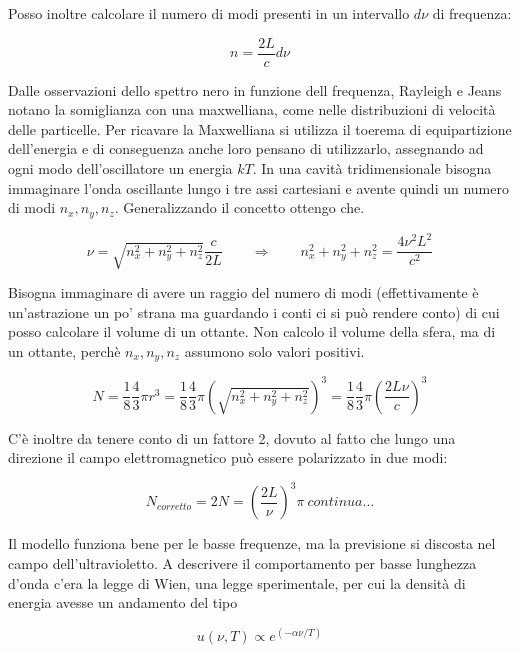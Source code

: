 \documentclass[11pt,a4paper]{article}
\begin{document}
Posso inoltre calcolare il numero di modi presenti in un intervallo $ d\nu $ di frequenza:

\begin{equation}
n = \frac{2L}{c} d\nu
\end{equation}

Dalle osservazioni dello spettro nero in funzione dell frequenza, Rayleigh e Jeans notano la somiglianza con una maxwelliana, come nelle distribuzioni di velocità delle particelle. Per ricavare la Maxwelliana si utilizza il toerema di equipartizione dell'energia e di conseguenza anche loro pensano di utilizzarlo, assegnando ad ogni modo dell'oscillatore un energia $ kT $. In una cavità tridimensionale bisogna immaginare l'onda oscillante lungo i tre assi cartesiani e avente quindi un numero di modi $ n_x, n_y, n_z $. Generalizzando il concetto ottengo che.

\begin{equation}
\nu = \sqrt{n_x^2 + n_y^2 + n_z^2}\frac{c}{2L} \qquad \Rightarrow \qquad n_x^2 + n_y^2 + n_z^2 = \frac{4\nu^2L^2}{c^2}
\end{equation}

Bisogna immaginare di avere un raggio del numero di modi (effettivamente è un'astrazione un po' strana ma guardando i conti ci si può rendere conto) di cui posso calcolare il volume di un ottante. Non calcolo il volume della sfera, ma di un ottante, perchè $ n_x, n_y, n_z $ assumono solo valori positivi.

\begin{equation}
N = \frac{1}{8} \frac{4}{3} \pi r^3 = \frac{1}{8} \frac{4}{3} \pi (\sqrt{n_x^2 + n_y^2 + n_z^2})^3 = \frac{1}{8} \frac{4}{3} \pi \left( \frac{2L\nu}{c} \right)^3
\end{equation}

C'è inoltre da tenere conto di un fattore 2, dovuto al fatto che lungo una direzione il campo elettromagnetico può essere polarizzato in due modi:

\begin{equation}
N_{corretto} = 2 N  = \left( \frac{2L}{\nu} \right)^3 \pi \ continua...
\end{equation}

Il modello funziona bene per le basse frequenze, ma la previsione si discosta nel campo dell'ultravioletto. A descrivere il comportamento per basse lunghezza d'onda c'era la legge di Wien, una legge sperimentale, per cui la densità di energia  avesse un andamento del tipo

\begin{equation}
u(\nu,T) \propto e^{(-\alpha \nu /  T)}
\end{equation}
\end{document}
